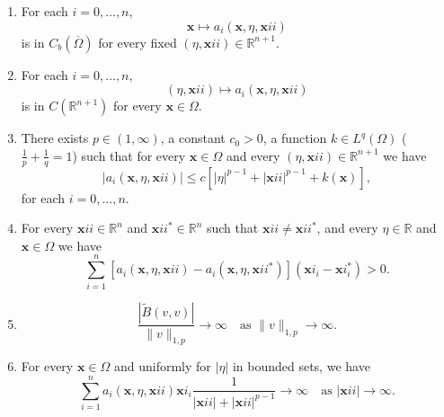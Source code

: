 \begin{enumerate}[label=HP-\arabic*.,ref=HP-\arabic*]\item\label{hyp:cv-pde-spatial-continuity} For each $i=0,\ldots,n$,
\begin{equation}\label{eq:cv-pde-coefficient-spatial-continuity}
\bm{x}\mapsto a_i(\bm{x},\eta,\bm{x}ii)
\end{equation}
is in $C_b(\overline\Omega)$ for every fixed $(\eta,\bm{x}ii)\in\mathbb{R}^{n+1}$.

\item\label{hyp:cv-pde-value-continuity} For each $i=0,\ldots,n$,
\begin{equation}\label{eq:cv-pde-coefficient-value-gradient-continuity}
(\eta,\bm{x}ii)\mapsto a_i(\bm{x},\eta,\bm{x}ii)
\end{equation}
is in $C(\mathbb{R}^{n+1})$ for every $\bm{x}\in\Omega$.

\item\label{hyp:cv-pde-growth} There exists $p\in(1,\infty)$, a constant $c_0>0$, a function $k\in L^q(\Omega)$ ($\frac{1}{p}+\frac{1}{q}=1$) such that for every $\bm{x}\in\Omega$ and every $(\eta,\bm{x}ii)\in\mathbb{R}^{n+1}$ we have
\begin{equation}\label{eq:cv-pde-coefficient-growth-bound}
|a_i(\bm{x},\eta,\bm{x}ii)|\leq c[|\eta|^{p-1}+|\bm{x}ii|^{p-1}+k(\bm{x})],
\end{equation}
for each $i=0,\ldots,n$.

\item\label{hyp:cv-pde-strict-gradient-monotonicity} For every $\bm{x}ii\in\mathbb{R}^n$ and $\bm{x}ii^*\in\mathbb{R}^n$ such that $\bm{x}ii\neq\bm{x}ii^*$, and every $\eta\in\mathbb{R}$ and $\bm{x}\in\Omega$ we have
\begin{equation}\label{eq:cv-pde-strict-highest-order-monotonicity}
\sum_{i=1}^n[a_i(\bm{x},\eta,\bm{x}ii)-a_i(\bm{x},\eta,\bm{x}ii^*)](\bm{x}i_i-\bm{x}i_i^*)>0.
\end{equation}


\item\label{hyp:cv-pde-form-coercivity}
\begin{equation}\label{eq:cv-pde-absolute-bivariate-coercivity-hypothesis}
\dfrac{|\widetilde B(v,v)|}{\|v\|_{1,p}}\to\infty\quad\text{as }\|v\|_{1,p}\to\infty.
\end{equation}


\item\label{hyp:cv-pde-uniform-gradient-coercivity} For every $\bm{x}\in\Omega$ and uniformly for $|\eta|$ in bounded sets, we have
\begin{equation}\label{eq:cv-pde-uniform-gradient-coercivity-hypothesis}
\sum_{i=1}^na_i(\bm{x},\eta,\bm{x}ii)\bm{x}i_i\dfrac{1}{|\bm{x}ii|+|\bm{x}ii|^{p-1}}\to\infty\quad\text{as }|\bm{x}ii|\to\infty.
\end{equation}
\end{enumerate}

